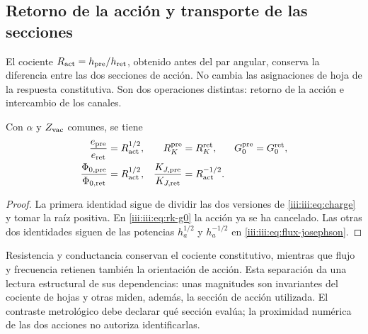\subsection{Retorno de la acción y transporte de las secciones}

El cociente $R_{\rm act}=h_{\rm pre}/h_{\rm ret}$, obtenido antes del
par angular, conserva la diferencia entre las dos secciones de acción.
No cambia las asignaciones de hoja de la respuesta constitutiva. Son dos
operaciones distintas: retorno de la acción e intercambio de los canales.

\begin{proposition}
Con $\alpha$ y $Z_{\rm vac}$ comunes, se tiene
\begin{align}
 \frac{e_{\rm pre}}{e_{\rm ret}}&=R_{\rm act}^{1/2},
 &R_K^{\rm pre}&=R_K^{\rm ret},
 &G_0^{\rm pre}&=G_0^{\rm ret},\label{iii:iii:eq:charge-return}\\
 \frac{\Phi_{0,\rm pre}}{\Phi_{0,\rm ret}}&=R_{\rm act}^{1/2},
 &\frac{K_{J,\rm pre}}{K_{J,\rm ret}}&=R_{\rm act}^{-1/2}.
 \label{iii:iii:eq:flux-return}
\end{align}
\end{proposition}
\begin{proof}
La primera identidad sigue de dividir las dos versiones de
\eqref{iii:iii:eq:charge} y tomar la raíz positiva. En
\eqref{iii:iii:eq:rk-g0} la acción ya se ha cancelado. Las otras dos
identidades siguen de las potencias $h_a^{1/2}$ y $h_a^{-1/2}$ en
\eqref{iii:iii:eq:flux-josephson}.
\end{proof}

Resistencia y conductancia conservan el cociente constitutivo, mientras
que flujo y frecuencia retienen también la orientación de acción. Esta
separación da una lectura estructural de sus dependencias: unas magnitudes
son invariantes del cociente de hojas y otras miden, además, la sección de
acción utilizada. El contraste metrológico debe declarar qué sección evalúa;
la proximidad numérica de las dos acciones no autoriza identificarlas.
